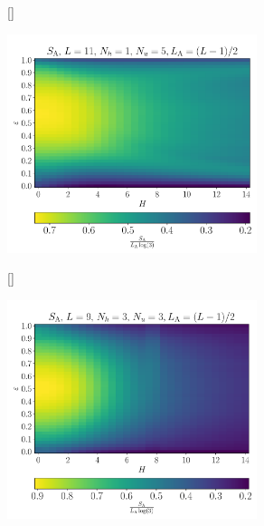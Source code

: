 \begin{figure}[H]
[\FBwidth]
{\caption{}\label{fig:H_ent_entro_density_11_5_1}}
{\includegraphics[width=0.65\textwidth]{H_sweep_ent_entropy_density_plot_11_1_5.pdf}}
\end{figure} 

\begin{figure}[H]
\caption{}
\label{fig:W_ent_entro_density_9_3_3}
\end{figure} 
\begin{figure}[H]
[\FBwidth]
{\caption{}\label{fig:H_ent_entro_density_9_3_3}}
{\includegraphics[width=0.65\textwidth]{H_sweep_ent_entropy_density_plot_9_3_3.pdf}}
\end{figure}  



